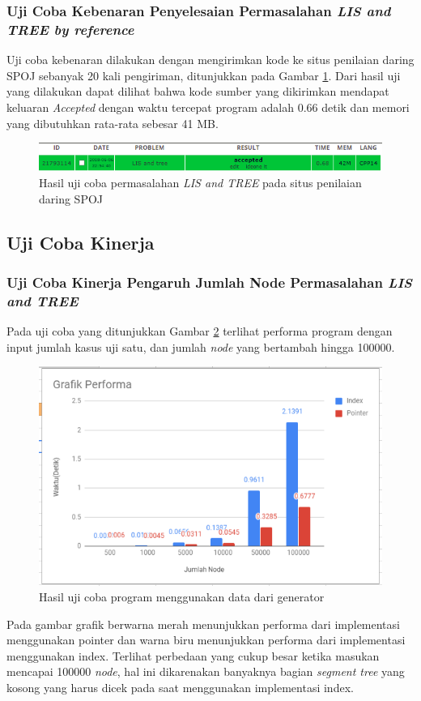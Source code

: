 		\subsubsection{\quad Uji Coba Kebenaran Penyelesaian Permasalahan \textit{LIS and TREE by reference}}
		\quad Uji coba kebenaran dilakukan dengan mengirimkan kode ke situs penilaian daring SPOJ sebanyak 20 kali pengiriman, ditunjukkan pada Gambar \ref{figure:accP}. Dari hasil uji yang dilakukan dapat dilihat bahwa kode sumber yang dikirimkan mendapat keluaran \textit{Accepted} dengan waktu tercepat program adalah 0.66 detik dan memori yang dibutuhkan rata-rata sebesar 41 MB.
		\begin{figure}[H]
			\centerline{ \includegraphics[scale=0.39]{assets/images/pointeracc.png}}
			\caption{Hasil uji coba permasalahan \textit{LIS and TREE} pada situs penilaian daring SPOJ}
			\label{figure:accP}
		\end{figure}
	\subsection{\quad Uji Coba Kinerja}
		
		\subsubsection{\quad Uji Coba Kinerja Pengaruh Jumlah Node Permasalahan \textit{LIS and TREE}}
		\quad Pada uji coba yang ditunjukkan Gambar \ref{figure:grafnode} terlihat performa program dengan input jumlah kasus uji satu, dan jumlah \textit{node} yang bertambah hingga 100000.
		\begin{figure}[H]
			\centerline{ \includegraphics[scale=0.65]{assets/images/GrafikPerformaNode.PNG}}
			\caption{Hasil uji coba program menggunakan data dari generator}
			\label{figure:grafnode}
		\end{figure}
		\quad Pada gambar grafik berwarna merah menunjukkan performa dari implementasi menggunakan pointer dan warna biru menunjukkan performa dari implementasi menggunakan index. Terlihat perbedaan yang cukup besar ketika masukan mencapai 100000 \textit{node}, hal ini dikarenakan banyaknya bagian \textit{segment tree} yang kosong yang harus dicek pada saat menggunakan implementasi index.
